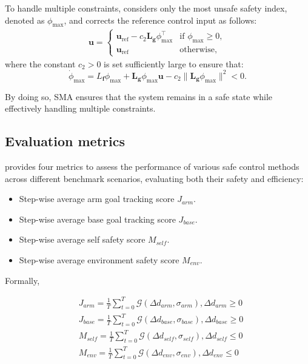 To handle multiple constraints, \spark considers only the most unsafe safety index, denoted as $\phi_{\max}$, and corrects the reference control input as follows:
\begin{align}
    \mathbf{u} = 
    \begin{cases} 
        \mathbf{u}_{\text{ref}} - c_2 \mathbf{L}_\mathbf{g} \phi_{\max}^\top & \text{if } \phi_{\max} \geq 0, \\
        \mathbf{u}_{\text{ref}} & \text{otherwise},
    \end{cases}
\end{align}
where the constant $c_2 > 0$ is set sufficiently large to ensure that:
\begin{equation}
    \dot{\phi}_{\max} = L_\mathbf{f} \phi_{\max} + \mathbf{L}_\mathbf{g} \phi_{\max} \mathbf{u} - c_2 \|\mathbf{L}_\mathbf{g} \phi_{\max}\|^2 < 0.
\end{equation}

By doing so, SMA ensures that the system remains in a safe state while effectively handling multiple constraints.

\subsection{Evaluation metrics}\label{subsec:evaluation_metrics}

\spark provides four metrics to assess the performance of various safe control methods across different benchmark scenarios, evaluating both their safety and efficiency:
\begin{itemize}
    \item Step-wise average arm goal tracking score $J_{arm}$.
    \item Step-wise average base goal tracking score $J_{base}$.
    \item Step-wise average self safety score $M_{self}$.
    \item Step-wise average environment safety score $M_{env}$.
\end{itemize}

Formally,

\begin{align}
    &J_{arm} =\frac{1}{T}\sum_{t=0}^T \mathcal{G}(\Delta d_{arm}, \sigma_{arm}), \Delta d_{arm} \geq 0\label{eq: arm goal score}\\ 
    &J_{base} =\frac{1}{T}\sum_{t=0}^T \mathcal{G}(\Delta d_{base}, \sigma_{base}), \Delta d_{base} \geq 0\label{eq: base goal score}\\
    &M_{self} =\frac{1}{T}\sum_{t=0}^T \mathcal{G}(\Delta d_{self},\sigma_{self}), \Delta d_{self} \leq 0\label{eq: self safety score}\\
    &M_{env} =\frac{1}{T}\sum_{t=0}^T \mathcal{G}(\Delta d_{env} ,\sigma_{env}), \Delta d_{env} \leq 0\label{eq: environment safety score}\\ \nonumber
\end{align}
% 


